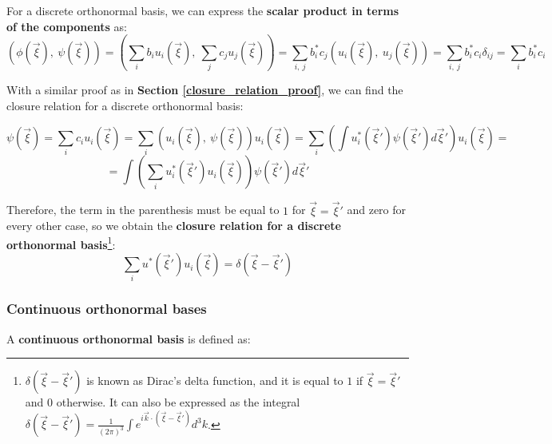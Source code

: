 For a discrete orthonormal basis, we can express the \textbf{scalar product in terms of the components} as:
\begin{equation}
    \left(\phi(\vec{\xi}), \ \psi(\vec{\xi})\right) = \left(\sum_i b_iu_i(\vec{\xi}), \ \sum_j c_ju_j(\vec{\xi})\right) = \sum_{i, \ j} b^*_i c_j \left(u_i(\vec{\xi}), \ u_j(\vec{\xi})\right) = \sum_{i,\ j} b^*_i c_i\delta_{ij} = \sum_i b^*_i c_i
\end{equation}

With a similar proof as in \textbf{Section \ref{closure_relation_proof}}, we can find the closure relation for a discrete orthonormal basis:

\begin{equation*}
    \psi(\vec{\xi}) = \sum_i c_i u_i(\vec{\xi}) = \sum_i \left(u_i(\vec{\xi}), \ \psi(\vec{\xi})\right) u_i(\vec{\xi}) = \sum_i \left( \int u_i^* (\vec{\xi}') \psi(\vec{\xi}')d\vec{\xi}'\right)u_i(\vec{\xi})  =    
\end{equation*}
\begin{equation}
    = \int \left( \sum_i u_i^* (\vec{\xi}') u_i(\vec{\xi})\right)\psi(\vec{\xi}')d\vec{\xi}'
\end{equation}

Therefore, the term in the parenthesis must be equal to $1$ for $\vec{\xi} =\vec{\xi}'$ and zero for every other case, so we obtain the \textbf{closure relation for a discrete orthonormal basis}\footnote{$\delta(\vec{\xi}-\vec{\xi}')$ is known as Dirac's delta function, and it is equal to $1$ if $\vec{\xi} = \vec{\xi}'$ and $0$ otherwise. It can also be expressed as the integral $\delta (\vec{\xi} - \vec{\xi}') = \frac{1}{(2\pi)^3}\int e^{i\vec{k}\cdot (\vec{\xi}-\vec{\xi}')}d^3k$.}:
\begin{equation}
    \sum_i u^*(\vec{\xi}')u_i(\vec{\xi}) = \delta(\vec{\xi} - \vec{\xi}')
\end{equation}

\subsubsection{Continuous orthonormal bases}

A \textbf{continuous orthonormal basis} is defined as:

